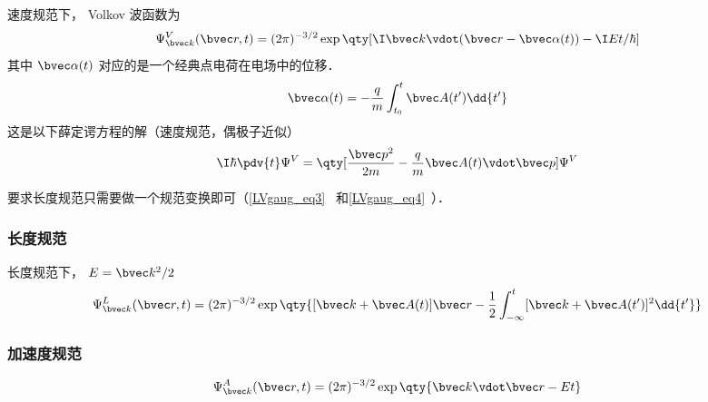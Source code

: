 
\begin{issues}
\issueDraft
\issueMissDepend
\end{issues}

速度规范下， Volkov 波函数为
\begin{equation}
\Psi_{\bvec k}^V(\bvec r, t) = (2\pi)^{-3/2} \exp\qty[\I \bvec k \vdot (\bvec r - \bvec \alpha(t)) - \I Et/\hbar]
\end{equation}
其中 $\bvec \alpha(t)$ 对应的是一个经典点电荷在电场中的位移．
\begin{equation}
\bvec \alpha(t) = -\frac{q}{m} \int_{t_0}^t \bvec A(t') \dd{t'}
\end{equation}
这是以下薛定谔方程的解（速度规范，偶极子近似）
\begin{equation}
\I\hbar \pdv{t} \Psi^V = \qty[\frac{\bvec p^2}{2m} - \frac{q}{m}\bvec A(t) \vdot \bvec p] \Psi^V
\end{equation}

要求长度规范只需要做一个规范变换即可（\autoref{LVgaug_eq3}~ 和\autoref{LVgaug_eq4}~）．

\subsubsection{长度规范}
长度规范下，  $E = \bvec k^2/2$
\begin{equation}
\Psi_{\bvec k}^L(\bvec r, t) = (2\pi)^{-3/2} \exp\qty{[\bvec k + \bvec A(t)]\bvec r - \frac{1}{2}\int_{-\infty}^t [\bvec k + \bvec A(t')]^2 \dd{t'}}
\end{equation}

\subsubsection{加速度规范}
\begin{equation}
\Psi_{\bvec k}^A(\bvec r, t) = (2\pi)^{-3/2} \exp\qty{\bvec k \vdot \bvec r - Et}
\end{equation}
